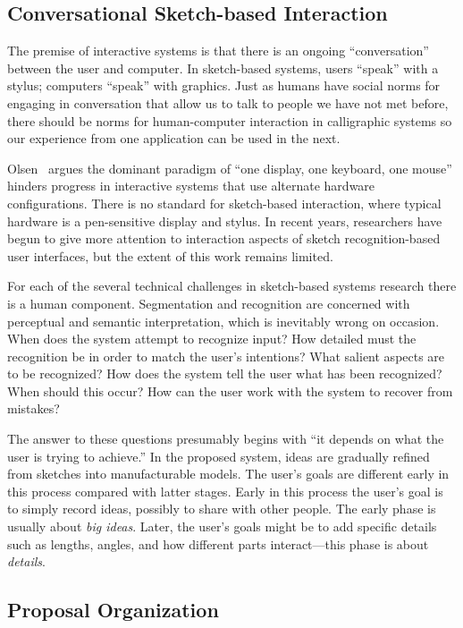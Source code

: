\documentclass[12pt]{article}
\begin{document}
\subsection{Conversational Sketch-based Interaction}

The premise of interactive systems is that there is an ongoing
``conversation'' between the user and computer. In sketch-based
systems, users ``speak'' with a stylus; computers ``speak'' with
graphics. Just as humans have social norms for engaging in
conversation that allow us to talk to people we have not met before,
there should be norms for human-computer interaction in calligraphic
systems so our experience from one application can be used in the
next.

Olsen~\cite{olsen-ui-research} argues the dominant paradigm of ``one
display, one keyboard, one mouse'' hinders progress in interactive
systems that use alternate hardware configurations. There is no
standard for sketch-based interaction, where typical hardware is a
pen-sensitive display and stylus. In recent years, researchers have
begun to give more attention to interaction aspects of sketch
recognition-based user interfaces, but the extent of this work remains
limited.

For each of the several technical challenges in sketch-based systems
research there is a human component. Segmentation and recognition are
concerned with perceptual and semantic interpretation, which is
inevitably wrong on occasion. When does the system attempt to
recognize input? How detailed must the recognition be in order to
match the user's intentions? What salient aspects are to be
recognized? How does the system tell the user what has been
recognized? When should this occur? How can the user work with the
system to recover from mistakes?

The answer to these questions presumably begins with ``it depends on
what the user is trying to achieve.'' In the proposed system, ideas
are gradually refined from sketches into manufacturable models. The
user's goals are different early in this process compared with latter
stages. Early in this process the user's goal is to simply record
ideas, possibly to share with other people. The early phase is usually
about \textit{big ideas}. Later, the user's goals might be to add
specific details such as lengths, angles, and how different parts
interact---this phase is about \textit{details}.

\subsection{Proposal Organization}
\end{document}
